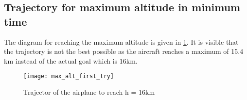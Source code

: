 \subsection{Trajectory for maximum altitude in minimum time}
The diagram for reaching the maximum altitude is given in \ref{fig:max_alt_first_try}.
It is visible that the trajectory is not the best possible as the aircraft reaches a maximum of 15.4 km
instead of the actual goal which is 16km.

\begin{figure}[H]
    \hspace*{-1cm}
    \centering
    \texttt{[image: max\_alt\_first\_try]}
    \caption{Trajector of the airplane to reach h = 16km}
    \label{fig:max_alt_first_try}
\end{figure}
